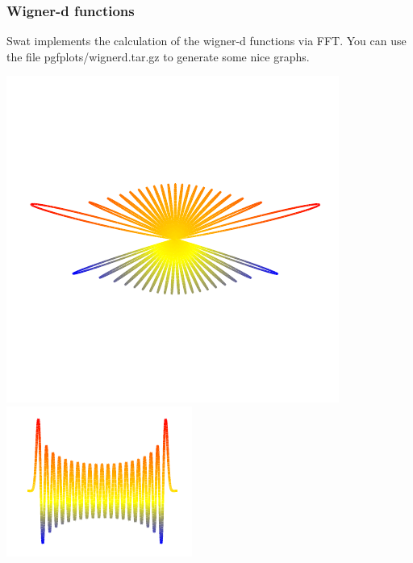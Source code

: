 \documentclass[12pt]{article}
\begin{document}
%
%
%
%

\subsubsection{Wigner-d functions}

Swat implements the calculation of the wigner-d functions via FFT.
You can use the file pgfplots/wignerd.tar.gz to generate some nice graphs.

\includegraphics[scale=1.0]{wignerpolar.pdf}
\includegraphics[scale=1.0]{wigner.pdf} 
\end{document}

